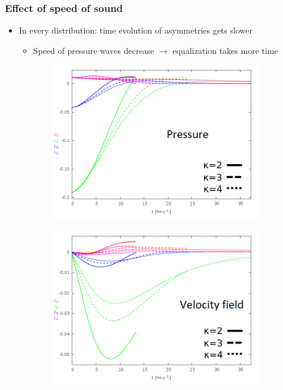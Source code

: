 \documentclass{beamer}
\begin{document}
\begin{frame}[noframenumbering]
\frametitle{Effect of speed of sound}
\begin{center}
\begin{itemize}
\setlength{\itemsep}{12pt}
\item<1-> In every distribution: time evolution of asymmetries gets slower
\vspace{8pt}
\begin{itemize}
\item<1-> Speed of pressure waves decrease $\rightarrow$ equalization takes more time
\end{itemize}
\end{itemize}
\begin{figure}[H]
	\centering
    \begin{subfigure}[b]{0.49\textwidth}
    		\includegraphics[width=\textwidth]{pic/res/rel/eps_kappa_p.png}
	\end{subfigure}
	\begin{subfigure}[b]{0.49\textwidth}
        	\includegraphics[width=\textwidth]{pic/res/rel/eps_kappa_v.png}
	\end{subfigure}
\end{figure}
\end{center}
\end{frame}
\end{document}
